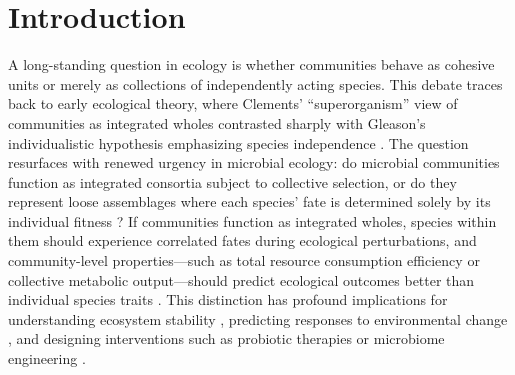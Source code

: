 \section{Introduction}
\label{sec:introduction}


A long-standing question in ecology is whether communities behave as cohesive units or merely as collections of independently acting species. This debate traces back to early ecological theory, where Clements' ``superorganism'' view of communities as integrated wholes contrasted sharply with Gleason's individualistic hypothesis emphasizing species independence \citep{Clements1916, Gleason1926}. The question resurfaces with renewed urgency in microbial ecology: do microbial communities function as integrated consortia subject to collective selection, or do they represent loose assemblages where each species' fate is determined solely by its individual fitness \citep{Shapiro1998, West2006}? If communities function as integrated wholes, species within them should experience correlated fates during ecological perturbations, and community-level properties---such as total resource consumption efficiency or collective metabolic output---should predict ecological outcomes better than individual species traits \citep{Tikhonov2016, Goldford2018}. This distinction has profound implications for understanding ecosystem stability \citep{May1972, Hu2022}, predicting responses to environmental change \citep{Allison2008}, and designing interventions such as probiotic therapies \citep{Zmora2018} or microbiome engineering \citep{Sanchez2021}.

